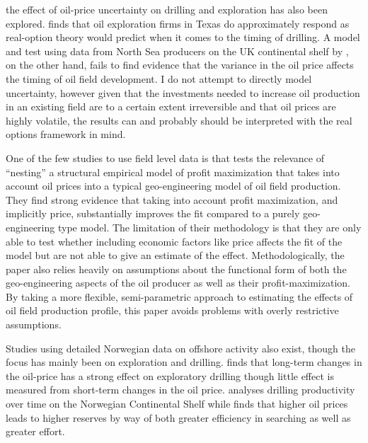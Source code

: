 \documentclass[12pt]{article}
\begin{document}
the effect of oil-price uncertainty on drilling and exploration has also been explored.  \citet{kellogg_effect_2010} finds that oil exploration firms in Texas do approximately respond as real-option theory would predict when it comes to the timing of drilling.  A model and test using data from North Sea producers on the UK continental shelf by \citet{hurn_geology_1994}, on the other hand, fails to find evidence that the variance in the oil price affects the timing of oil field development.  I do not attempt to directly model uncertainty, however given that the investments needed to increase oil production in an existing field are to a certain extent irreversible and that oil prices are highly volatile, the results can and probably should be interpreted with the real options framework in mind.  

One of the few studies to use field level data is \citet{black_is_1998} that tests the relevance of “nesting” a structural empirical model of profit maximization that takes into account oil prices into a typical geo-engineering model of oil field production.  They find strong evidence that taking into account profit maximization, and implicitly price, substantially improves the fit compared to a purely geo-engineering type model.   The limitation of their methodology is that they are only able to test whether including economic factors like price affects the fit of the model but are not able to give an estimate of the effect.  Methodologically, the paper also relies heavily on assumptions about the functional form of both the geo-engineering aspects of the oil producer as well as their profit-maximization.  By taking a more flexible, semi-parametric approach to estimating the effects of oil field production profile, this paper avoids problems with overly restrictive assumptions.  

Studies using detailed Norwegian data on offshore activity also exist, though the focus has mainly been on exploration and drilling.  \citet{mohn_exploration_2008} finds that long-term changes in the oil-price has a strong effect on exploratory drilling though little effect is measured from short-term changes in the oil price.  \citet{osmundsen_exploration_2010} analyses drilling productivity over time on the Norwegian Continental Shelf while \citet{mohn_efforts_2008} finds that higher oil prices leads to higher reserves by way of both greater efficiency in searching as well as greater effort.  
\end{document}
